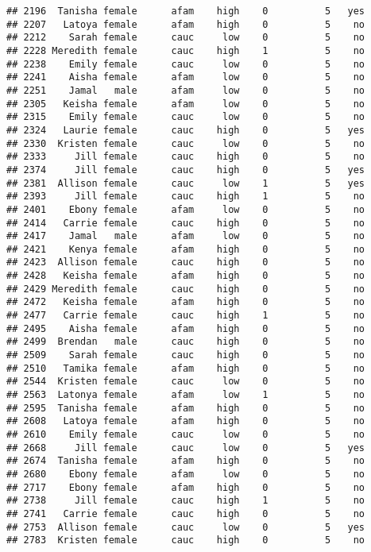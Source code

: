 \documentclass[
]{article}
\begin{document}
\begin{verbatim}
## 2196  Tanisha female      afam    high    0          5   yes
## 2207   Latoya female      afam    high    0          5    no
## 2212    Sarah female      cauc     low    0          5    no
## 2228 Meredith female      cauc    high    1          5    no
## 2238    Emily female      cauc     low    0          5    no
## 2241    Aisha female      afam     low    0          5    no
## 2251    Jamal   male      afam     low    0          5    no
## 2305   Keisha female      afam     low    0          5    no
## 2315    Emily female      cauc     low    0          5    no
## 2324   Laurie female      cauc    high    0          5   yes
## 2330  Kristen female      cauc     low    0          5    no
## 2333     Jill female      cauc    high    0          5    no
## 2374     Jill female      cauc    high    0          5   yes
## 2381  Allison female      cauc     low    1          5   yes
## 2393     Jill female      cauc    high    1          5    no
## 2401    Ebony female      afam     low    0          5    no
## 2414   Carrie female      cauc    high    0          5    no
## 2417    Jamal   male      afam     low    0          5    no
## 2421    Kenya female      afam    high    0          5    no
## 2423  Allison female      cauc    high    0          5    no
## 2428   Keisha female      afam    high    0          5    no
## 2429 Meredith female      cauc    high    0          5    no
## 2472   Keisha female      afam    high    0          5    no
## 2477   Carrie female      cauc    high    1          5    no
## 2495    Aisha female      afam    high    0          5    no
## 2499  Brendan   male      cauc    high    0          5    no
## 2509    Sarah female      cauc    high    0          5    no
## 2510   Tamika female      afam    high    0          5    no
## 2544  Kristen female      cauc     low    0          5    no
## 2563  Latonya female      afam     low    1          5    no
## 2595  Tanisha female      afam    high    0          5    no
## 2608   Latoya female      afam    high    0          5    no
## 2610    Emily female      cauc     low    0          5    no
## 2668     Jill female      cauc     low    0          5   yes
## 2674  Tanisha female      afam    high    0          5    no
## 2680    Ebony female      afam     low    0          5    no
## 2717    Ebony female      afam    high    0          5    no
## 2738     Jill female      cauc    high    1          5    no
## 2741   Carrie female      cauc    high    0          5    no
## 2753  Allison female      cauc     low    0          5   yes
## 2783  Kristen female      cauc    high    0          5    no

\end{verbatim}
\end{document}
